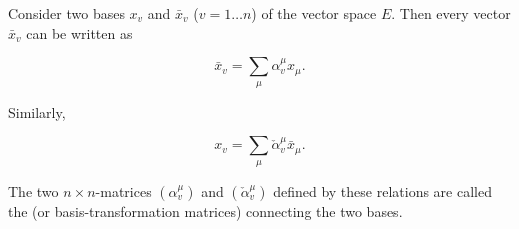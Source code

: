Consider two bases $x_v$ and $\bar{x}_v$ ($v = 1 \ldots n$) of the vector space $E$. Then every vector $\bar{x}_v$ can be written as

$$\bar{x}_v = \sum_{\mu} \alpha_v^\mu x_\mu.$$

Similarly,

$$x_v = \sum_{\mu} \check{\alpha}_v^\mu \bar{x}_\mu.$$

The two $n \times n$-matrices $(\alpha_v^\mu)$ and $(\check{\alpha}_v^\mu)$ defined by these relations are called the  (or basis-transformation matrices) connecting the two bases.
